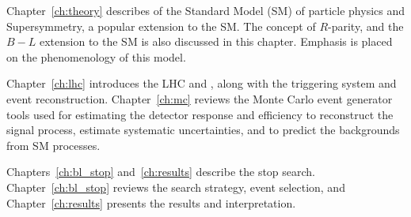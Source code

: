 Chapter~\ref{ch:theory} describes of the Standard Model (SM) of
particle physics and Supersymmetry, a popular extension to the SM.
The concept of $R$-parity, and the $B-L$ extension to the SM is also discussed
in this chapter.
Emphasis is placed on the phenomenology of this model.

Chapter~\ref{ch:lhc} introduces the LHC and \atlas, along with the triggering
system and event reconstruction.
Chapter~\ref{ch:mc} reviews the Monte Carlo event generator tools used for
estimating the detector response and efficiency to reconstruct the signal
process, estimate systematic uncertainties, and to predict the backgrounds
from SM processes.

Chapters~\ref{ch:bl_stop} and~\ref{ch:results} describe the stop search.
Chapter~\ref{ch:bl_stop} reviews the search strategy, event selection, and
Chapter~\ref{ch:results} presents the results and interpretation.

